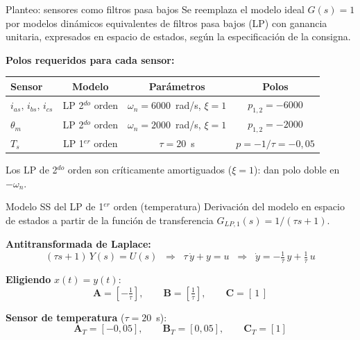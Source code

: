 \documentclass[aspectratio=169,t]{beamer}
\begin{document}
\begin{frame}{Planteo: sensores como filtros pasa bajos}
{\small\color{uncGray}Se reemplaza el modelo ideal $G(s)=1$ por modelos dinámicos equivalentes de filtros pasa bajos (LP) con ganancia unitaria, expresados en espacio de estados, según la especificación de la consigna.}\par
\vspace{3mm}

\textbf{Polos requeridos para cada sensor:}
\vspace{1mm}

\centering
\footnotesize
\renewcommand{\arraystretch}{1.2}
\begin{tabular}{|l|c|c|c|}
\hline
\textbf{Sensor} & \textbf{Modelo} & \textbf{Parámetros} & \textbf{Polos} \\
\hline
$i_{as},\,i_{bs},\,i_{cs}$ & LP 2$^{do}$ orden & $\omega_n = 6000$~rad/s, $\xi = 1$ & $p_{1,2} = -6000$ \\
$\theta_m$ & LP 2$^{do}$ orden & $\omega_n = 2000$~rad/s, $\xi = 1$ & $p_{1,2} = -2000$ \\
$T_s$ & LP 1$^{er}$ orden & $\tau = 20$~s & $p = -1/\tau = -0{,}05$ \\
\hline
\end{tabular}
\normalsize

\vspace{4mm}
{\small Los LP de 2$^{do}$ orden son críticamente amortiguados ($\xi=1$): dan polo doble en $-\omega_n$.}
\end{frame}

\begin{frame}{Modelo SS del LP de 1$^{er}$ orden (temperatura)}
{\small\color{uncGray}Derivación del modelo en espacio de estados a partir de la función de transferencia $G_{LP,1}(s)=1/(\tau s + 1)$.}\par
\vspace{3mm}

\textbf{Antitransformada de Laplace:}
\begin{equation*}
(\tau s + 1)\,Y(s) = U(s)
\;\;\Longrightarrow\;\;
\tau\,\dot y + y = u
\;\;\Longrightarrow\;\;
\dot y = -\tfrac{1}{\tau}\,y + \tfrac{1}{\tau}\,u
\end{equation*}

\textbf{Eligiendo} $x(t) = y(t)$:
\begin{equation*}
\bm{A} = \left[-\tfrac{1}{\tau}\right],
\qquad
\bm{B} = \left[\tfrac{1}{\tau}\right],
\qquad
\bm{C} = [\,1\,]
\end{equation*}

\textbf{Sensor de temperatura} ($\tau = 20$~s):
\begin{equation*}
\bm{A}_T = [-0{,}05],
\qquad
\bm{B}_T = [0{,}05],
\qquad
\bm{C}_T = [1]
\end{equation*}
\end{frame}
\end{document}
